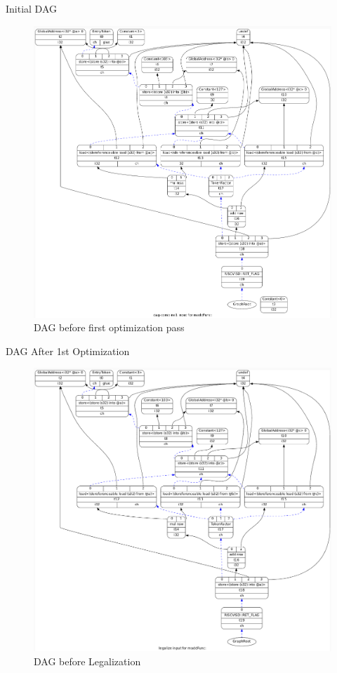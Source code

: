 \begin{frame}{Initial DAG}
    \begin{figure}
    \centering
    \includegraphics[height=0.75\textheight]{path_instruction/madd_dag_combine1.png}
    \caption{DAG before first optimization pass}
    \label{fig:combine1}
    \end{figure}
\end{frame}

\begin{frame}{DAG After 1st Optimization}
    \begin{figure}
    \centering
    \includegraphics[width=0.77\textheight]{path_instruction/madd_dag_legalize.png}
    \caption{DAG before Legalization}
    \label{fig:legalize}
\end{figure}
\end{frame}


